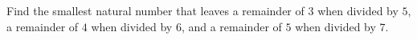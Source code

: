 Find the smallest natural number that leaves a remainder of $3$ when divided by $5$, a remainder of $4$ when divided by $6$, and a remainder of $5$ when divided by $7$.
